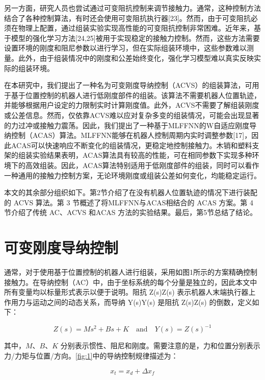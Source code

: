 \documentclass{Diploma}
\begin{document}
另一方面，研究人员也尝试通过可变阻抗控制来调节接触力。通常，这种控制方法结合了各种控制算法，有时还会使用可变阻抗执行器[23]。然而，由于可变阻抗必须在物理上配置，通过组装实验实现高性能的可变阻抗控制非常困难。近年来，基于模型的强化学习方法[24,25]被用于实现稳定的接触力控制。然而，这些方法需要设置环境的刚度和阻尼参数以进行学习，但在实际组装环境中，这些参数难以测量。此外，由于组装情况中的刚度和公差始终变化，强化学习模型难以真实反映实际的组装环境。

在本研究中，我们提出了一种名为可变刚度导纳控制（ACVS）的组装算法，可用于基于位置控制的机器人进行低刚度部件的组装。该算法不需要机器人位置轨迹，并能够根据用户设定的力限制实时计算刚度值。此外，ACVS不需要了解组装刚度或公差信息。然而，仅依靠ACVS难以应对复杂多变的组装情况，可能会出现显著的力过冲或接触力震荡。因此，我们提出了一种基于MLFFNN的W自适应刚度导纳控制（ACAS）算法。MLFFNN能够在机器人控制周期内实时调整参数[17]，因此ACAS可以快速响应不断变化的组装情况，更稳定地控制接触力。木销和塑料支架的组装实验结果表明，ACAS算法具有较高的性能，可在相同参数下实现多种环境下的高效组装。因此，ACAS算法特别适用于低刚度部件的组装，同时可以看作一种通用的接触力控制方案，无论环境刚度或组装公差如何变化，均能稳定运行。

本文的其余部分组织如下。第2节介绍了在没有机器人位置轨迹的情况下进行装配的 ACVS 算法。第 3 节概述了将MLFFNN与ACAS相结合的 ACAS 方案。第 4 节介绍了传统 AC、ACVS 和ACAS 方法的实验结果。最后，第5节总结了结论。
\section{可变刚度导纳控制}
通常，对于使用基于位置控制的机器人进行组装，采用如图1所示的方案精确控制接触力。在导纳控制（AC）中，由于坐标系统的每个分量是独立的，因此本文中所有变量均以标量形式表示以便于说明。阻抗 Z(s)Z(s) 表示机器人末端执行器上作用力与运动之间的动态关系，而导纳 Y(s)Y(s) 是阻抗 Z(s)Z(s) 的倒数，定义如下：

\begin{equation} \label{eq:Z_Y}
Z(s) = Ms^2 + Bs + K \quad \text{and} \quad Y(s) = Z(s)^{-1}
\end{equation}

其中，$M$、$B$、$K$ 分别表示惯性、阻尼和刚度。需要注意的是，力和位置分别表示力/力矩与位置/方向。\ref{fig:1}中的导纳控制规律描述为：

%

\begin{equation} \label{eq:AC}
  x_t=x_d+\Delta x_f
\end{equation}
\end{document}
